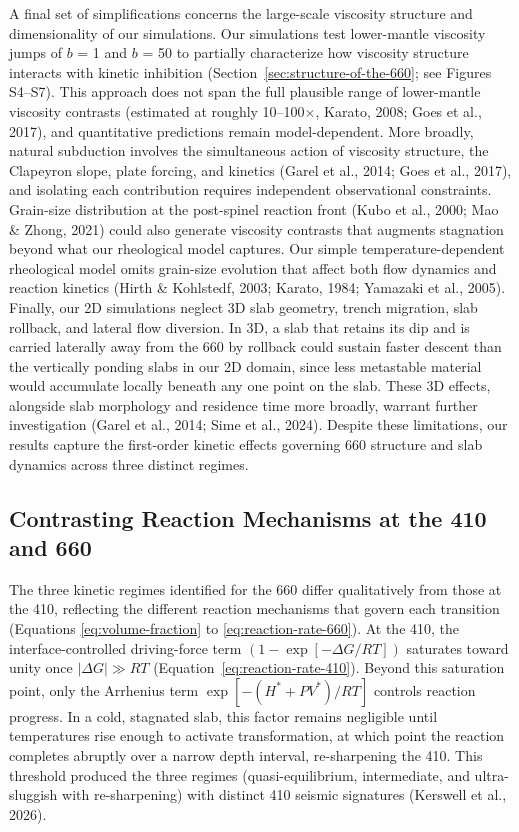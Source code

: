 \documentclass[draft,linenumbers]{agujournal2019}
\begin{document}
A final set of simplifications concerns the large-scale viscosity
structure and dimensionality of our simulations. Our simulations test
lower-mantle viscosity jumps of \(b\) = 1 and \(b\) = 50 to partially
characterize how viscosity structure interacts with kinetic inhibition
(Section~\ref{sec:structure-of-the-660}; see Figures S4--S7). This
approach does not span the full plausible range of lower-mantle
viscosity contrasts (estimated at roughly 10--100\(\times\), Karato,
2008; {Goes et al.}, 2017), and quantitative predictions remain
model-dependent. More broadly, natural subduction involves the
simultaneous action of viscosity structure, the Clapeyron slope, plate
forcing, and kinetics (Garel et al., 2014; {Goes et al.}, 2017), and
isolating each contribution requires independent observational
constraints. Grain-size distribution at the post-spinel reaction front
(Kubo et al., 2000; Mao \& Zhong, 2021) could also generate viscosity
contrasts that augments stagnation beyond what our rheological model
captures. Our simple temperature-dependent rheological model omits
grain-size evolution that affect both flow dynamics and reaction
kinetics (Hirth \& Kohlstedf, 2003; Karato, 1984; Yamazaki et al.,
2005). Finally, our 2D simulations neglect 3D slab geometry, trench
migration, slab rollback, and lateral flow diversion. In 3D, a slab that
retains its dip and is carried laterally away from the 660 by rollback
could sustain faster descent than the vertically ponding slabs in our 2D
domain, since less metastable material would accumulate locally beneath
any one point on the slab. These 3D effects, alongside slab morphology
and residence time more broadly, warrant further investigation (Garel et
al., 2014; {Sime et al.}, 2024). Despite these limitations, our results
capture the first-order kinetic effects governing 660 structure and slab
dynamics across three distinct regimes.

\subsection{Contrasting Reaction Mechanisms at the 410 and
660}\label{sec:contrasting-reaction-mechanisms-at-the-410-and-660}

The three kinetic regimes identified for the 660 differ qualitatively
from those at the 410, reflecting the different reaction mechanisms that
govern each transition (Equations \ref{eq:volume-fraction} to
\ref{eq:reaction-rate-660}). At the 410, the interface-controlled
driving-force term \((1 - \exp[-\Delta G / RT])\) saturates toward unity
once \(|\Delta G| \gg RT\) (Equation~\ref{eq:reaction-rate-410}). Beyond
this saturation point, only the Arrhenius term
\(\exp[-(H^\ast + PV^\ast)/RT]\) controls reaction progress. In a cold,
stagnated slab, this factor remains negligible until temperatures rise
enough to activate transformation, at which point the reaction completes
abruptly over a narrow depth interval, re-sharpening the 410. This
threshold produced the three regimes (quasi-equilibrium, intermediate,
and ultra-sluggish with re-sharpening) with distinct 410 seismic
signatures (Kerswell et al., 2026).
\end{document}
